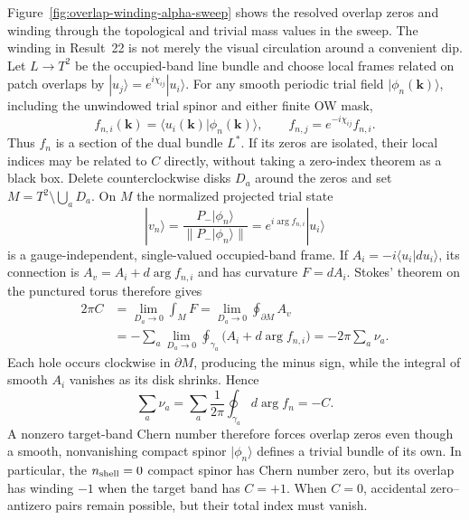 \documentclass[aps,prb,twocolumn,floatfix,nofootinbib,superscriptaddress]{revtex4-2}
\begin{document}
Figure~\ref{fig:overlap-winding-alpha-sweep} shows the resolved overlap zeros and winding
through the topological and trivial mass values in the sweep.
The winding in Result~22 is not merely the visual circulation around a convenient dip.
Let $L\to T^2$ be the occupied-band line bundle and choose local frames related on patch
overlaps by $|u_j\rangle=e^{i\chi_{ij}}|u_i\rangle$.  For any smooth periodic trial field
$|\phi_n(\mathbf{k})\rangle$, including the unwindowed trial spinor and either finite OW
mask,
\begin{equation}
 f_{n,i}(\mathbf{k})=\langle u_i(\mathbf{k})|\phi_n(\mathbf{k})\rangle,
 \qquad f_{n,j}=e^{-i\chi_{ij}}f_{n,i}.
 \label{eq:legacy-overlap-dual-section}
\end{equation}
Thus $f_n$ is a section of the dual bundle $L^*$.  If its zeros are isolated, their local
indices may be related to $C$ directly, without taking a zero-index theorem as a black
box.  Delete counterclockwise disks $D_a$ around the zeros and set
$M=T^2\setminus\bigcup_aD_a$.  On $M$ the normalized projected trial state
\begin{equation}
 |v_n\rangle=\frac{P_-|\phi_n\rangle}{\|P_-|\phi_n\rangle\|}
 =e^{i\arg f_{n,i}}|u_i\rangle
 \label{eq:legacy-overlap-projected-frame}
\end{equation}
is a gauge-independent, single-valued occupied-band frame.  If
$A_i=-i\langle u_i|d u_i\rangle$, its connection is
$A_v=A_i+d\arg f_{n,i}$ and has curvature $F=dA_i$.  Stokes' theorem on the punctured
torus therefore gives
\begin{equation}
 \begin{aligned}
 2\pi C&=\lim_{D_a\to0}\int_MF
 =\lim_{D_a\to0}\oint_{\partial M}A_v\\
 &=-\sum_a\lim_{D_a\to0}\oint_{\gamma_a}
 \bigl(A_i+d\arg f_{n,i}\bigr)
 =-2\pi\sum_a\nu_a.
 \end{aligned}
 \label{eq:legacy-overlap-stokes-proof}
\end{equation}
Each hole occurs clockwise in $\partial M$, producing the minus sign, while the integral
of smooth $A_i$ vanishes as its disk shrinks.  Hence
\begin{equation}
 \sum_a\nu_a
 =\sum_a\frac{1}{2\pi}\oint_{\gamma_a}d\arg f_n
 =-C.
 \label{eq:legacy-overlap-chern-index}
\end{equation}
A nonzero target-band Chern number therefore forces overlap zeros even though a smooth,
nonvanishing compact spinor $|\phi_n\rangle$ defines a trivial bundle of its own.  In
particular, the $n_{\rm shell}=0$ compact spinor has Chern number zero, but its overlap
has winding $-1$ when the target band has $C=+1$.  When $C=0$, accidental
zero--antizero pairs remain possible, but their total index must vanish.
\end{document}
